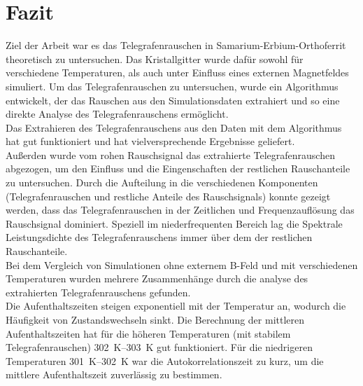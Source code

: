 \documentclass[main.tex]{subfiles}
\begin{document}
\newpage
\section{Fazit}


Ziel der Arbeit war es das Telegrafenrauschen in Samarium-Erbium-Orthoferrit theoretisch zu untersuchen. Das Kristallgitter wurde dafür sowohl für verschiedene Temperaturen, als auch unter Einfluss eines externen Magnetfeldes simuliert. 
Um das Telegrafenrauschen zu untersuchen, wurde ein Algorithmus entwickelt, der das Rauschen aus den Simulationsdaten extrahiert und so eine direkte Analyse des Telegrafenrauschens ermöglicht.\\

Das Extrahieren des Telegrafenrauschens aus den Daten mit dem Algorithmus hat gut funktioniert und hat vielversprechende Ergebnisse geliefert.\\
Außerden wurde vom rohen Rauschsignal das extrahierte Telegrafenrauschen abgezogen, um den Einfluss und die Eingenschaften der restlichen Rauschanteile zu untersuchen.
Durch die Aufteilung in die verschiedenen Komponenten (Telegrafenrauschen und restliche Anteile des Rauschsignals) konnte gezeigt werden, dass das Telegrafenrauschen in der Zeitlichen und Frequenzauflösung das Rauschsignal dominiert. Speziell im niederfrequenten Bereich lag die Spektrale Leistungsdichte des Telegrafenrauschens immer über dem der restlichen Rauschanteile.\\

Bei dem Vergleich von Simulationen ohne externem B-Feld und mit verschiedenen Temperaturen wurden mehrere Zusammenhänge durch die analyse des extrahierten Telegrafenrauschens gefunden.\\
Die Aufenthaltszeiten steigen exponentiell mit der Temperatur an, wodurch die Häufigkeit von Zustandswechseln sinkt. Die Berechnung der mittleren Aufenthaltszeiten hat für die höheren Temperaturen (mit stabilem Telegrafenrauschen) \SIrange{302}{303}{\kelvin} gut funktioniert. Für die niedrigeren Temperaturen \SIrange{301}{302}{\kelvin} war die Autokorrelationszeit zu kurz, um die mittlere Aufenthaltszeit zuverlässig zu bestimmen.\\
\end{document}
